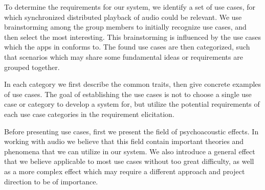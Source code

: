 To determine the requirements for our system, we identify a set of use cases, for which synchronized distributed playback of audio could be relevant.
We use brainstorming among the group members to initially recognize use cases, and then select the most interesting.
This brainstorming is influenced by the use cases which the apps in  conforms to.
The found use cases are then categorized, such that scenarios which may share some fundamental ideas or requirements are grouped together.

In each category we first describe the common traits, then give concrete examples of use cases.
The goal of establishing the use cases is not to choose a single use case or category to develop a system for, but utilize the potential requirements of each use case categories in the requirement elicitation.

Before presenting use cases, first we present the field of psychoacoustic effects.
In working with audio we believe that this field contain important theories and phenomena that we can utilize in our system.
We also introduce a general effect that we believe applicable to most use cases without too great difficulty, as well as a more complex effect which may require a different approach and project direction to be of importance.
